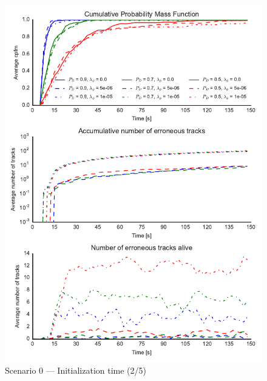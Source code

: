 \begin{figure}
\centering
\includegraphics{Figures/plots/Scenario0_Init-Time(2-5).pdf}
\caption{Scenario 0 --- Initialization time (2/5)}\label{fig:init0_time_2-5}
\end{figure}

